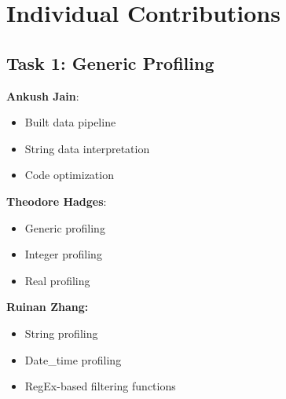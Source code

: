 \documentclass[sigconf,authordraft]{acmart}
\begin{document}
\section{Individual Contributions}
\subsection{Task 1: Generic Profiling}
\textbf{Ankush Jain}: 
\begin{itemize}
    \item Built data pipeline
    \item String data interpretation
    \item Code optimization
\end{itemize}
\textbf{Theodore Hadges}: 
\begin{itemize}
    \item Generic profiling
    \item Integer profiling
    \item Real profiling
\end{itemize}
\textbf{Ruinan Zhang:}
\begin{itemize}
    \item String profiling
    \item Date\_time profiling
    \item RegEx-based filtering functions
\end{itemize} 

\vfill\null
\columnbreak
\end{document}
